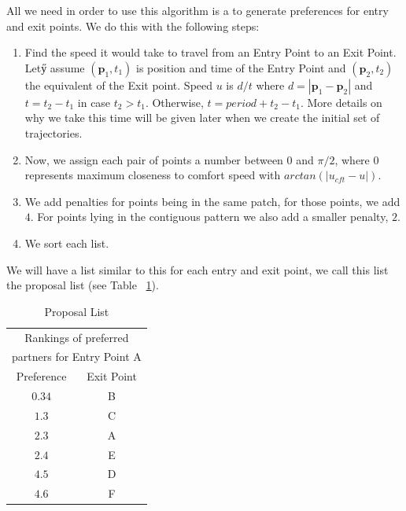 All we need in order to use this algorithm is a to generate preferences for entry and exit points. We do this with the following steps:
\begin{enumerate}
  \item Find the speed it would take to travel from an Entry Point to an Exit Point.  Letӳ assume $(\mathbf{p}_1, t_1)$ is position and time of the Entry Point and $(\mathbf{p}_2,t_2)$ the equivalent of the Exit point. Speed $u$ is $d/t$ where $d=|\mathbf{p}_1-\mathbf{p}_2|$ and $t=t_2-t_1$ in case $t_2>t_1$. Otherwise, $t=period+t_2-t_1$. More details on why we take this time will be given later when we create the initial set of trajectories.
  \item Now, we assign each pair of points a number between $0$ and $\pi/2$, where $0$ represents maximum closeness to comfort speed with $arctan(|u_{cft} -u|)$.
  \item We add penalties for points being in the same patch, for those points, we add $4$. For points lying in the contiguous pattern we also add a smaller penalty, $2$.
  \item We sort each list.
\end{enumerate}
 
We will have a list similar to this for each entry and exit point, we call this list the proposal list (see Table ~\ref{tab:proposal-list}).

\begin{table}[b]
	\centering
	\caption{Proposal List}
	\begin{tabular}{|c|c|}
		\multicolumn{2}{c}{Rankings of preferred}\\
		\multicolumn{2}{c}{partners for Entry Point A}\\
		\hline
		Preference	& Exit Point\\
		\hline\hline
		$0.34$		&	B\\
		$1.3$		&	C\\
		$2.3$		&	A\\
		$2.4$		&	E\\
		$4.5$		&	D\\
		$4.6$		&	F\\
		\hline
		\end{tabular}
	\label{tab:proposal-list}
\end{table}


